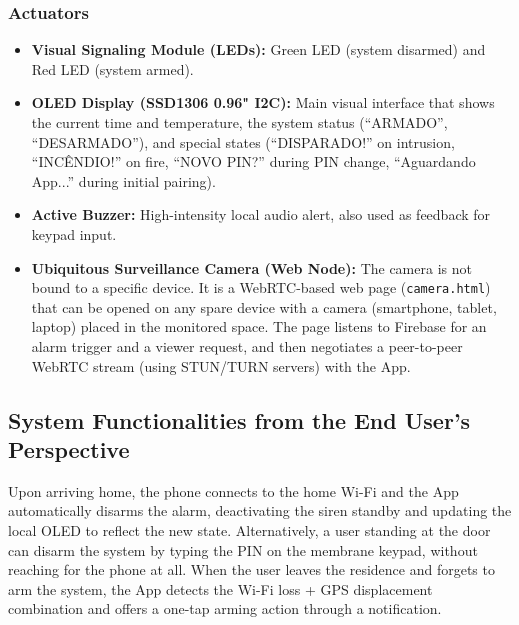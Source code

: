 \documentclass[10pt,twocolumn]{article}
\begin{document}
\subsubsection{Actuators}
\begin{itemize}
    \item \textbf{Visual Signaling Module (LEDs):} Green LED (system disarmed) and Red LED (system armed).
    \item \textbf{OLED Display (SSD1306 0.96" I2C):} Main visual interface that shows the current time and temperature, the system status (``ARMADO'', ``DESARMADO''), and special states (``DISPARADO!'' on intrusion, ``INCÊNDIO!'' on fire, ``NOVO PIN?'' during PIN change, ``Aguardando App...'' during initial pairing).
    \item \textbf{Active Buzzer:} High-intensity local audio alert, also used as feedback for keypad input.
    \item \textbf{Ubiquitous Surveillance Camera (Web Node):} The camera is not bound to a specific device. It is a WebRTC-based web page (\texttt{camera.html}) that can be opened on any spare device with a camera (smartphone, tablet, laptop) placed in the monitored space. The page listens to Firebase for an alarm trigger and a viewer request, and then negotiates a peer-to-peer WebRTC stream (using STUN/TURN servers) with the App.
\end{itemize}

\subsection{System Functionalities from the End User's Perspective}
Upon arriving home, the phone connects to the home Wi-Fi and the App automatically disarms the alarm, deactivating the siren standby and updating the local OLED to reflect the new state. Alternatively, a user standing at the door can disarm the system by typing the PIN on the membrane keypad, without reaching for the phone at all. When the user leaves the residence and forgets to arm the system, the App detects the Wi-Fi loss + GPS displacement combination and offers a one-tap arming action through a notification.
\end{document}
